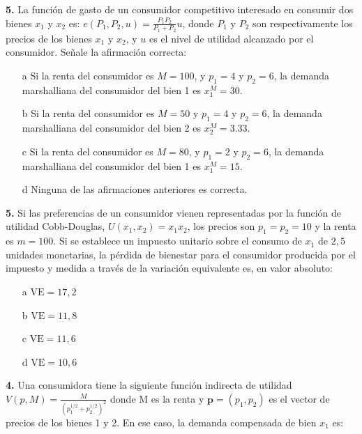 \documentclass{nuevotema}
\begin{document}
\preguntas


\textbf{5.} La función de gasto de un consumidor competitivo interesado en consumir dos bienes $x_1$ y $x_2$ es: $e(P_1, P_2, u) = \frac{P_1 P_2}{P_1 + P_2}u$, donde $P_1$ y $P_2$ son respectivamente los precios de los bienes $x_1$ y $x_2$, y $u$ es el nivel de utilidad alcanzado por el consumidor. Señale la afirmación correcta:

\begin{itemize}
	\item[a] Si la renta del consumidor es $M = 100$, y $p_1 = 4$ y $p_2 = 6$, la demanda marshalliana del consumidor del bien 1 es $x_1^M = 30$.
	\item[b] Si la renta del consumidor es $M = 50$ y $p_1 = 4$ y $p_2 = 6$, la demanda marshalliana del consumidor del bien 2 es $x_2^M = 3.33$.
	\item[c] Si la renta del consumidor es $M = 80$, y $p_1 = 2$ y $p_2 = 6$, la demanda marshalliana del consumidor del bien 1 es $x_1^M = 15$.
	\item[d] Ninguna de las afirmaciones anteriores es correcta.
\end{itemize}



\textbf{5.} Si las preferencias de un consumidor vienen representadas por la función de utilidad Cobb-Douglas, $U(x_1, x_2) = x_1 x_2$, los precios son $p_1 = p_2 = 10$ y la renta es $m=100$. Si se establece un impuesto unitario sobre el consumo de $x_1$ de $2,5$ unidades monetarias, la pérdida de bienestar para el consumidor producida por el impuesto y medida a través de la variación equivalente es, en valor absoluto:

\begin{itemize}
	\item[a] $\text{VE} = 17,2$
	\item[b] $\text{VE} = 11,8$
	\item[c] $\text{VE} = 11,6$
	\item[d] $\text{VE} = 10,6$
\end{itemize}


\textbf{4.} Una consumidora tiene la siguiente función indirecta de utilidad $V(p, M) = \frac{M}{(p_1^{1/2} + p_2^{1/2})^2}$ donde M es la renta y $\textbf{p}=(p_1, p_2)$ es el vector de precios de los bienes 1 y 2. En ese caso, la demanda compensada de bien $x_1$ es:
\end{document}
